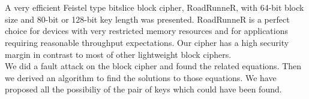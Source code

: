 \section*{\fontsize{25}{29}\selectfont{\textbf Conclusion} \\}


A very efficient Feistel type bitslice block cipher, RoadRunneR, with 64-bit block size and 80-bit or 128-bit key length was presented. RoadRunneR is a perfect choice for devices with very restricted memory resources and for applications requiring reasonable throughput expectations. Our cipher has a high security margin in contrast to most of other lightweight block ciphers.\\

We did a fault attack on the block cipher and found the related equations. Then we derived an algorithm to find the solutions to those equations. We have proposed all the possibiliy of the pair of keys which could have been found.

